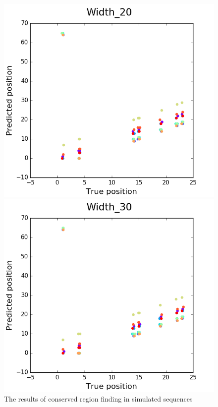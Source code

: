 \documentclass[11pt, oneside]{article}
\begin{document}
\begin{figure}[htbp]
\begin{minipage}{0.32\textwidth}
  \end{minipage}
  \hfill
  \begin{minipage}{0.32\textwidth}
    \centering
    \includegraphics[width=\textwidth]{images/Width_20} %
  \end{minipage}
  \hfill
  \begin{minipage}{0.32\textwidth}
    \centering
    \includegraphics[width=\textwidth]{images/Width_30} %
  \end{minipage}
  \caption{The results of conserved region finding in simulated sequences}
  \label{fig:proof}
\end{figure}
\end{document}
